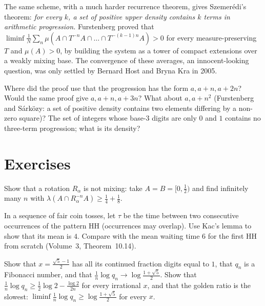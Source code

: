 The same scheme, with a much harder recurrence theorem, gives Szemer\'edi's theorem: \emph{for every $k$, a set of positive upper density contains $k$ terms in arithmetic progression.} Furstenberg proved that
$\liminf\frac1N\sum_n\mu(A\cap T^{-n}A\cap\dots\cap T^{-(k-1)n}A)>0$ for every measure-preserving $T$ and $\mu(A)>0$, by building the system as a tower of compact extensions over a weakly mixing base. The
convergence of these averages, an innocent-looking question, was only settled by Bernard Host and Bryna Kra in 2005.

\begin{think}
Where did the proof use that the progression has the form $a,a+n,a+2n$? Would the same proof give $a,a+n,a+3n$? What about $a,a+n^2$ (Furstenberg and S\'ark\"ozy: a set of positive density contains two elements differing by a non-zero
square)? The set of integers whose base-$3$ digits are only $0$ and $1$ contains no three-term progression; what is its density?
\end{think}

\section{Exercises}

\begin{exercise}[$\star$]\label{ex:rotnotmix}
Show that a rotation $R_\alpha$ is not mixing: take $A=B=[0,\frac12)$ and find infinitely many $n$ with $\lambda(A\cap R_\alpha^{-n}A)\ge\frac14+\frac18$.
\end{exercise}

\begin{exercise}[$\star$]\label{ex:kacword}
In a sequence of fair coin tosses, let $\tau$ be the time between two consecutive occurrences of the pattern HH (occurrences may overlap). Use Kac's lemma to show that its mean is $4$. Compare with the mean waiting time $6$
for the first HH from scratch (Volume~3, Theorem~10.14).
\end{exercise}

\begin{exercise}[$\star$]\label{ex:golden}
Show that $x=\frac{\sqrt5-1}2$ has all its continued fraction digits equal to $1$, that $q_n$ is a Fibonacci number, and that $\frac1n\log q_n\to\log\frac{1+\sqrt5}2$. Show that $\frac1n\log q_n\ge\frac12\log 2-\frac{\log2}{2n}$ for every
irrational $x$, and that the golden ratio is the slowest: $\liminf\frac1n\log q_n\ge\log\frac{1+\sqrt5}2$ for every $x$.
\end{exercise}


